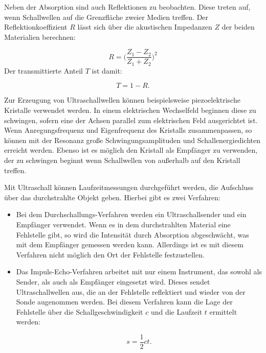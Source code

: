 Neben der Absorption sind auch Reflektionen zu beobachten. Diese treten auf, wenn Schallwellen auf die Grenzfläche zweier Medien treffen. Der Reflektionkoeffizient $R$ lässt sich über die akustischen Impedanzen $Z$ der beiden Materialien
berechnen:

\begin{equation}
R = \biggl(\frac{Z_1 - Z_2}{Z_1 + Z_2}\biggr)^2
\end{equation}
Der transmittierte Anteil $T$ ist damit:

\begin{equation}
T = 1 - R.
\end{equation}

Zur Erzeugung von Ultraschallwellen können beispielsweise piezoelektrische Kristalle verwendet werden. In einem elektrischen Wechselfeld beginnen diese zu schwingen, sofern eine der Achsen parallel zum elektrischen Feld ausgerichtet ist.
Wenn Anregungsfrequenz und Eigenfrequenz des Kristalls zusammenpassen, so können mit der Resonanz große Schwingungsamplituden und Schallenergiedichten erreicht werden. Ebenso ist es möglich den Kristall als Empfänger zu verwenden, der 
zu schwingen beginnt wenn Schallwellen von außerhalb auf den Kristall treffen. 

Mit Ultraschall können Laufzeitmessungen durchgeführt werden, die Aufschluss über das durchstrahlte Objekt geben. Hierbei gibt es zwei Verfahren:

\begin{itemize}
	\item Bei dem Durchschallungs-Verfahren werden ein Ultraschallsender und ein Empfänger verwendet. Wenn es in dem durchstrahlten Material eine Fehlstelle gibt, so wird die Intensität durch Absorption abgeschwächt, was mit dem Empfänger 
	gemessen werden kann. Allerdings ist es mit diesem Verfahren nicht möglich den Ort der Fehlstelle festzustellen.
	\item Das Impuls-Echo-Verfahren arbeitet mit nur einem Instrument, das sowohl als Sender, als auch als Empfänger eingesetzt wird. Dieses sendet Ultraschallwellen aus, die an der Fehlstelle reflektiert und wieder von der Sonde augenommen
	werden. Bei diesem Verfahren kann die Lage der Fehlstelle über die Schallgeschwindigkeit $c$ und die Laufzeit $t$ ermittelt werden:
	
	\begin{equation}
	\label{eq:time}
	s = \frac{1}{2} c t.
	\end{equation}
\end{itemize}

